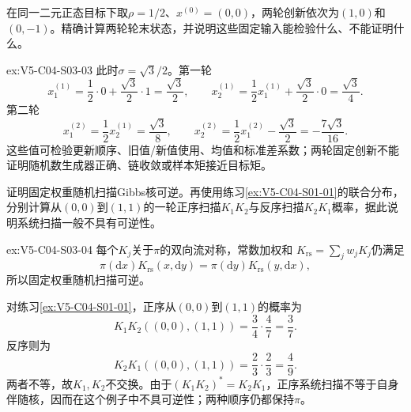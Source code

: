 \begin{SLChapterExercisePairSection}
\begin{exercise}\label{ex:V5-C04-S03-03}
在同一二元正态目标下取$\rho=1/2$、$x^{(0)}=(0,0)$，两轮创新依次为$(1,0)$和$(0,-1)$。精确计算两轮轮末状态，并说明这些固定输入能检验什么、不能证明什么。
\end{exercise}
\ifSLFullEdition
{}\label{sol:V5-C04-S03-03}
\begin{chapterexercisesolution}{ex:V5-C04-S03-03}
此时$\sigma=\sqrt3/2$。第一轮
\[
x_1^{(1)}=\frac12\cdot0+\frac{\sqrt3}{2}\cdot1=\frac{\sqrt3}{2},
\qquad
x_2^{(1)}=\frac12x_1^{(1)}+\frac{\sqrt3}{2}\cdot0=\frac{\sqrt3}{4}.
\]
第二轮
\[
x_1^{(2)}=\frac12x_2^{(1)}=\frac{\sqrt3}{8},
\qquad
x_2^{(2)}=\frac12x_1^{(2)}-\frac{\sqrt3}{2}
=-\frac{7\sqrt3}{16}.
\]
这些值可检验更新顺序、旧值/新值使用、均值和标准差系数；两轮固定创新不能证明随机数生成器正确、链收敛或样本矩接近目标矩。
\end{chapterexercisesolution}
\fi

\begin{exercise}\label{ex:V5-C04-S03-04}
证明固定权重随机扫描Gibbs核可逆。再使用练习\ref{ex:V5-C04-S01-01}的联合分布，分别计算从$(0,0)$到$(1,1)$的一轮正序扫描$K_1K_2$与反序扫描$K_2K_1$概率，据此说明系统扫描一般不具有可逆性。
\end{exercise}
\ifSLFullEdition
{}\label{sol:V5-C04-S03-04}
\begin{chapterexercisesolution}{ex:V5-C04-S03-04}
每个$K_j$关于$\pi$的双向流对称，常数加权和
$K_{\mathrm{rs}}=\sum_jw_jK_j$仍满足
\[
\pi(\mathrm dx)K_{\mathrm{rs}}(x,\mathrm dy)
=\pi(\mathrm dy)K_{\mathrm{rs}}(y,\mathrm dx),
\]
所以固定权重随机扫描可逆。

对练习\ref{ex:V5-C04-S01-01}，正序从$(0,0)$到$(1,1)$的概率为
\[
K_1K_2((0,0),(1,1))=\frac34\cdot\frac47=\frac37.
\]
反序则为
\[
K_2K_1((0,0),(1,1))=\frac23\cdot\frac23=\frac49.
\]
两者不等，故$K_1,K_2$不交换。由于$(K_1K_2)^*=K_2K_1$，正序系统扫描不等于自身伴随核，因而在这个例子中不具可逆性；两种顺序仍都保持$\pi$。
\end{chapterexercisesolution}
\fi


\end{SLChapterExercisePairSection}
